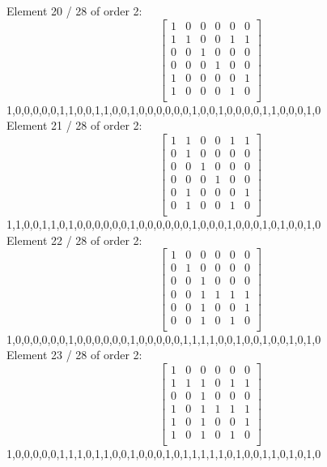Element    20 / 28 of order 2:
$$
\left[
\begin{array}{*{6}{r}}
1 & 0 & 0 & 0 & 0 & 0\\
1 & 1 & 0 & 0 & 1 & 1\\
0 & 0 & 1 & 0 & 0 & 0\\
0 & 0 & 0 & 1 & 0 & 0\\
1 & 0 & 0 & 0 & 0 & 1\\
1 & 0 & 0 & 0 & 1 & 0\\
\end{array}
\right]
$$
1,0,0,0,0,0,1,1,0,0,1,1,0,0,1,0,0,0,0,0,0,1,0,0,1,0,0,0,0,1,1,0,0,0,1,0\\
Element    21 / 28 of order 2:
$$
\left[
\begin{array}{*{6}{r}}
1 & 1 & 0 & 0 & 1 & 1\\
0 & 1 & 0 & 0 & 0 & 0\\
0 & 0 & 1 & 0 & 0 & 0\\
0 & 0 & 0 & 1 & 0 & 0\\
0 & 1 & 0 & 0 & 0 & 1\\
0 & 1 & 0 & 0 & 1 & 0\\
\end{array}
\right]
$$
1,1,0,0,1,1,0,1,0,0,0,0,0,0,1,0,0,0,0,0,0,1,0,0,0,1,0,0,0,1,0,1,0,0,1,0\\
Element    22 / 28 of order 2:
$$
\left[
\begin{array}{*{6}{r}}
1 & 0 & 0 & 0 & 0 & 0\\
0 & 1 & 0 & 0 & 0 & 0\\
0 & 0 & 1 & 0 & 0 & 0\\
0 & 0 & 1 & 1 & 1 & 1\\
0 & 0 & 1 & 0 & 0 & 1\\
0 & 0 & 1 & 0 & 1 & 0\\
\end{array}
\right]
$$
1,0,0,0,0,0,0,1,0,0,0,0,0,0,1,0,0,0,0,0,1,1,1,1,0,0,1,0,0,1,0,0,1,0,1,0\\
Element    23 / 28 of order 2:
$$
\left[
\begin{array}{*{6}{r}}
1 & 0 & 0 & 0 & 0 & 0\\
1 & 1 & 1 & 0 & 1 & 1\\
0 & 0 & 1 & 0 & 0 & 0\\
1 & 0 & 1 & 1 & 1 & 1\\
1 & 0 & 1 & 0 & 0 & 1\\
1 & 0 & 1 & 0 & 1 & 0\\
\end{array}
\right]
$$
1,0,0,0,0,0,1,1,1,0,1,1,0,0,1,0,0,0,1,0,1,1,1,1,1,0,1,0,0,1,1,0,1,0,1,0\\
